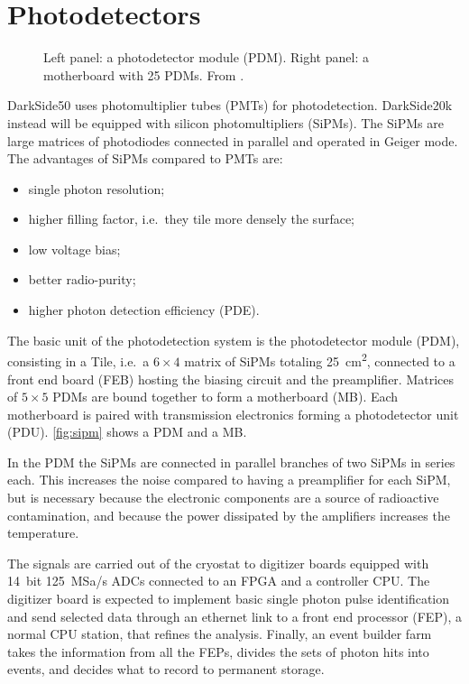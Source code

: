 \section{Photodetectors}

\begin{figure}
    
    
    \caption{\label{fig:sipm} Left panel: a photodetector module (PDM). Right
    panel: a motherboard with 25 PDMs. From \cite[4]{aalseth2019}.}
    
\end{figure}

DarkSide50 uses photomultiplier tubes (PMTs) for photodetection. DarkSide20k
instead will be equipped with silicon photomultipliers (SiPMs). The SiPMs are
large matrices of photodiodes connected in parallel and operated in Geiger
mode. The advantages of SiPMs compared to PMTs are:
%
\begin{itemize}
    
    \item single photon resolution;
    
    \item higher filling factor, i.e.\ they tile more densely the surface;
    
    \item low voltage bias;
    
    \item better radio-purity;
    
    \item higher photon detection efficiency (PDE).

\end{itemize}

The basic unit of the photodetection system is the photodetector module (PDM),
consisting in a Tile, i.e.\ a $6\times 4$ matrix of SiPMs totaling
\SI{25}{cm^2}, connected to a front end board (FEB) hosting the biasing circuit
and the preamplifier. Matrices of $5\times 5$ PDMs are bound together to form a
motherboard (MB). Each motherboard is paired with transmission electronics
forming a photodetector unit (PDU). \autoref{fig:sipm} shows a PDM and a MB.

In the PDM the SiPMs are connected in parallel branches of two SiPMs in series
each. This increases the noise compared to having a preamplifier for each SiPM,
but is necessary because the electronic components are a source of radioactive
contamination, and because the power dissipated by the amplifiers increases the
temperature.

The signals are carried out of the cryostat to digitizer boards equipped with
14~bit \SI{125}{MSa/s} ADCs connected to an FPGA and a controller CPU. The
digitizer board is expected to implement basic single photon pulse
identification and send selected data through an ethernet link to a front end
processor (FEP), a normal CPU station, that refines the analysis. Finally, an
event builder farm takes the information from all the FEPs, divides the sets of
photon hits into events, and decides what to record to permanent storage.
